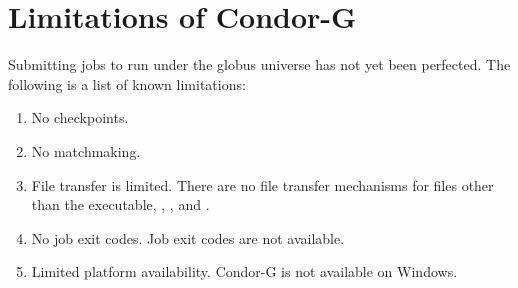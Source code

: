 \section{\label{sec:Condor-G-Limits}Limitations of Condor-G}

Submitting jobs to run under the globus universe has not yet
been perfected.
The following is a list of known limitations:

\begin{enumerate}
\item{No checkpoints.}
\item{No matchmaking.}
\item{File transfer is limited.}
There are no file transfer mechanisms for files other
than the executable, , , and .
\item{No job exit codes.}
Job exit codes are not available.
\item{Limited platform availability.}
Condor-G is not available on Windows.
\end{enumerate}
